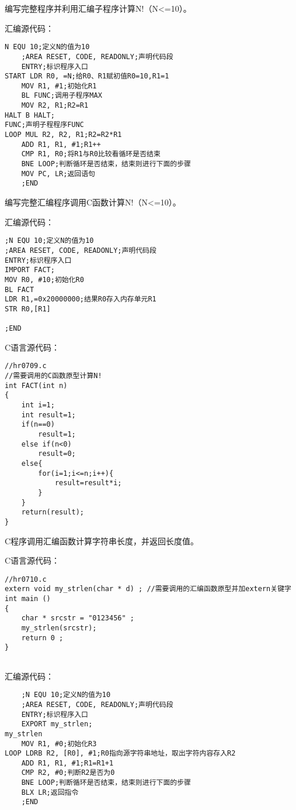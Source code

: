 \documentclass[11pt,letter,notitlepage,UTF8]{ctexart}
\begin{document}
\begin{exercise}[7.8]
	编写完整程序并利用汇编子程序计算N!（N<=10）。	
\end{exercise}
\begin{solution}
汇编源代码：
\begin{lstlisting}
N EQU 10;定义N的值为10
	;AREA RESET, CODE, READONLY;声明代码段
	ENTRY;标识程序入口
START LDR R0, =N;给R0、R1赋初值R0=10,R1=1
	MOV R1, #1;初始化R1
	BL FUNC;调用子程序MAX
	MOV R2, R1;R2=R1
HALT B HALT;
FUNC;声明子程程序FUNC
LOOP MUL R2, R2, R1;R2=R2*R1
	ADD R1, R1, #1;R1++
	CMP R1, R0;将R1与R0比较看循环是否结束
	BNE LOOP;判断循环是否结束，结束则进行下面的步骤
	MOV PC, LR;返回语句
	;END

\end{lstlisting}
\end{solution}

\begin{exercise}[7.9]
	编写完整汇编程序调用C函数计算N!（N<=10）。	
\end{exercise}
\begin{solution}
汇编源代码：
\begin{lstlisting}
;N EQU 10;定义N的值为10
;AREA RESET, CODE, READONLY;声明代码段
ENTRY;标识程序入口
IMPORT FACT;
MOV R0, #10;初始化R0
BL FACT
LDR R1,=0x20000000;结果R0存入内存单元R1
STR R0,[R1]

;END

\end{lstlisting}
C语言源代码：
\begin{lstlisting}
//hr0709.c
//需要调用的C函数原型计算N!
int FACT(int n)
{
	int i=1;
	int result=1;
	if(n==0)
		result=1;
	else if(n<0)
		result=0;
	else{
		for(i=1;i<=n;i++){
			result=result*i;
		}
	}
	return(result);
}

\end{lstlisting}
\end{solution}

\begin{exercise}[7.10]
	C程序调用汇编函数计算字符串长度，并返回长度值。	
\end{exercise}
\begin{solution}
C语言源代码：
\begin{lstlisting}
//hr0710.c
extern void my_strlen(char * d) ; //需要调用的汇编函数原型并加extern关键字
int main ()
{
	char * srcstr = "0123456" ;
	my_strlen(srcstr);
	return 0 ;
}
	
\end{lstlisting}
汇编源代码：
\begin{lstlisting}
	;N EQU 10;定义N的值为10
	;AREA RESET, CODE, READONLY;声明代码段
	ENTRY;标识程序入口
	EXPORT my_strlen;
my_strlen
	MOV R1, #0;初始化R3
LOOP LDRB R2, [R0], #1;R0指向源字符串地址，取出字符内容存入R2
	ADD R1, R1, #1;R1=R1+1
	CMP R2, #0;判断R2是否为0
	BNE LOOP;判断循环是否结束，结束则进行下面的步骤
	BLX LR;返回指令
	;END

\end{lstlisting}
\end{solution}
\end{document}
